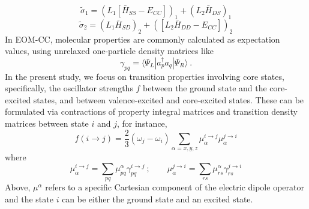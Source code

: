 \documentclass[journal=jctcce,manuscript=article]{achemso}
\begin{document}
\begin{equation} 
\tilde{\sigma}_1 = (L_1[\bar{H}_{SS}-E_{CC}])_1 + (L_2\bar{H}_{DS})_1
\end{equation}
\begin{equation} 
\tilde{\sigma}_2 = (L_1\bar{H}_{SD})_2 + ([L_2\bar{H}_{DD}-E_{CC}])_2
\end{equation}
    In EOM-CC, molecular properties are commonly calculated as expectation values, using unrelaxed
    one-particle density matrices like
\begin{equation}
\label{gamma}
 \gamma_{pq} = \langle \Psi_L | a_p^\dagger a_q | \Psi_R \rangle~.
\end{equation}
%
In the present study, we focus on transition properties involving core states, specifically, the oscillator strengths $f$ between the ground state and the core-excited states, and between valence-excited and core-excited states. 
These can be formulated via contractions of property integral matrices and transition density matrices between state $i$ and $j$, for instance,
\begin{equation}
f (i \to j) = \frac{2}{3}(\omega_j - \omega_i) \sum_{\alpha=x,y,z} \mu^{i\to j}_{\alpha} 
\mu^{j\to i}_{\alpha}
\end{equation}
where 
\begin{equation}
\mu_\alpha^{i\to j}
= \sum_{pq} \mu^{\alpha}_{pq} \gamma^{ i\to j}_{pq}~; \quad \quad
\mu_\alpha^{j\to i} = \sum_{rs} \mu^{\alpha}_{rs} \gamma^{j\to i }_{rs}
\label{strength}
\end{equation}
Above, $\mu^\alpha$ refers to a specific Cartesian component of the electric dipole operator and the state $i$ can be either the ground state and an excited state.
\end{document}
